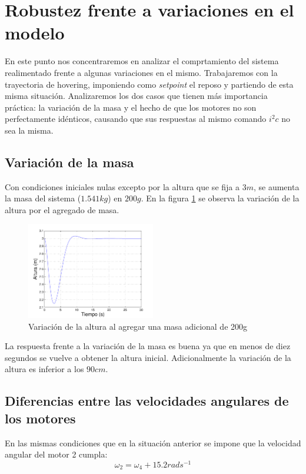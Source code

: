 \documentclass[main]{subfiles}
\begin{document}
\section{Robustez frente a variaciones en el modelo}
\label{sec:robustez}

En este punto nos concentraremos en analizar el comprtamiento del sistema realimentado frente a algunas variaciones en el mismo. Trabajaremos con la trayectoria de hovering, imponiendo como \emph{setpoint} el reposo y partiendo de esta misma situaci\'on. Analizaremos los dos casos que tienen m\'as importancia pr\'actica: la variaci\'on de la masa y el hecho de que los motores no son perfectamente id\'enticos, causando que sus respuestas al mismo comando $i^2c$ no sea la misma.
\subsection*{Variaci\'on de la masa}
Con condiciones iniciales nulas excepto por la altura que se fija a $3m$, se aumenta la masa del sistema ($1.541kg$) en $200 g$. En la figura \ref{fig:masa} se observa la variaci\'on de la altura por el agregado de masa.


\begin{figure}[h!]
  \centering
	\includegraphics[width=0.5\textwidth]{./pics_sim_control/robustez/masa.pdf}
  \caption{Variaci\'on de la altura al agregar una masa adicional de 200g}
  \label{fig:masa}
\end{figure}

La respuesta frente a la variaci\'on de la masa es buena ya que en menos de diez segundos se vuelve a obtener la altura inicial. Adicionalmente la variaci\'on de la altura es inferior a los $90 cm$.

\subsection*{Diferencias entre las velocidades angulares de los motores}

En las mismas condiciones que en la situaci\'on anterior se impone que la velocidad angular del motor 2 cumpla: 
\begin{equation}
\omega_2 = \omega_4 + 15.2rad s^{-1}
\end{equation}
\end{document}
